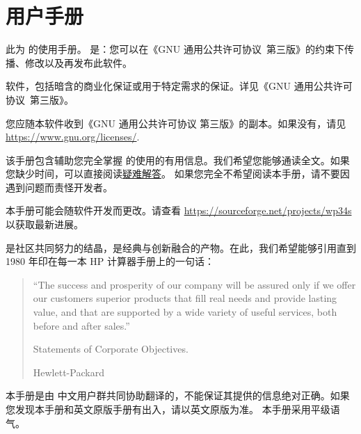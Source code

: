
\chapter{\wpx 用户手册}

此为 \wpx 的使用手册。 \wpx 是：您可以在《GNU 通用公共许可协议~第三版》的约束下传播、修改以及再发布此软件。

\wpx 软件，包括暗含的商业化保证或用于特定需求的保证。详见《GNU 通用公共许可协议~第三版》。

您应随本软件收到《GNU 通用公共许可协议 第三版》的副本。如果没有，请见\url{https://www.gnu.org/licenses/}.

该手册包含辅助您完全掌握 \wpx 的使用的有用信息。我们希望您能够通读全文。如果您缺少时间，可以直接阅读\hyperref[chapter:troubleshooting]{疑难解答}。
如果您完全不希望阅读本手册，请不要因遇到问题而责怪开发者。

本手册可能会随软件开发而更改。请查看 \url{https://sourceforge.net/projects/wp34s} 以获取最新进展。

\wpx 是社区共同努力的结晶，是经典与创新融合的产物。在此，我们希望能够引用直到 1980 年印在每一本 HP 计算器手册上的一句话：

\begin{quote}
``The success and prosperity of our company will be assured only if we offer our 
customers superior products that fill real needs and provide lasting value, and 
that are supported by a wide variety of useful services, both before and after 
sales.''

\begin{flushright}
Statements of Corporate Objectives.

Hewlett-Packard
\end{flushright}
\end{quote}

本手册是由 \wpx 中文用户群共同协助翻译的，不能保证其提供的信息绝对正确。如果您发现本手册和英文原版手册有出入，请以英文原版为准。
本手册采用平级语气。